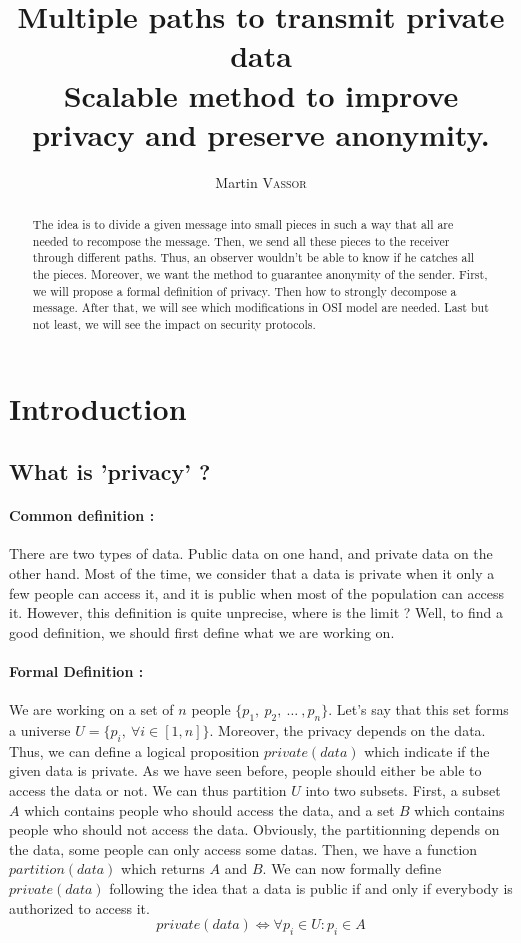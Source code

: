 \documentclass[a4paper, onecolumn, 10pt]{article}
\title{Multiple paths to transmit private data\\\large{Scalable method to improve privacy and preserve anonymity.}}
\author{Martin \textsc{Vassor}}
\numberwithin{equation}{section}
\begin{document}
\newcommand{\figref}[1]{\textsc{Fig.}\ref{#1} p.\pageref{#1}}
\newtheorem{plop}{Rule}

\maketitle
\begin{abstract}
The idea is to divide a given message into small pieces in such a way that all are needed to recompose the message. Then, we send all these pieces to the receiver through different paths. Thus, an observer wouldn't be able to know if he catches all the pieces. Moreover, we want the method to guarantee anonymity of the sender. First, we will propose a formal definition of privacy. Then how to strongly decompose a message. After that, we will see which modifications in OSI model are needed. Last but not least, we will see the impact on security protocols. 
\end{abstract}

\section{Introduction}
\subsection{What is 'privacy' ?}
\paragraph{Common definition :}
There are two types of data. Public data on one hand, and private data on the other hand. Most of the time, we consider that a data is private when it only a few people can access it, and it is public when most of the population can access it. However, this definition is quite unprecise, where is the limit ? Well, to find a good definition, we should first define what we are working on. 
\paragraph{Formal Definition :}
We are working on a set of $n$ people $\{p_1,\ p_2,\ \dots\ , p_n\}$. Let's say that this set forms a universe $U=\{p_i,\ \forall i \in [1, n]\}$. Moreover, the privacy depends on the data. Thus, we can define a logical proposition $private(data)$ which indicate if the given data is private. As we have seen before, people should either be able to access the data or not. We can thus partition $U$ into two subsets. First, a subset $A$ which contains people who should access the data, and a set $B$ which contains people who should not access the data. Obviously, the partitionning depends on the data, some people can only access some datas. Then, we have a function $partition(data)$ which returns $A$ and $B$. We can now formally define $private(data)$ following the idea that a data is public if and only if everybody is authorized to access it.
\begin{equation} \label{eq:privateDef1}
  \boxed{private(data)\Leftrightarrow\forall p_i \in U:p_i \in A}
\end{equation}
\end{document}
